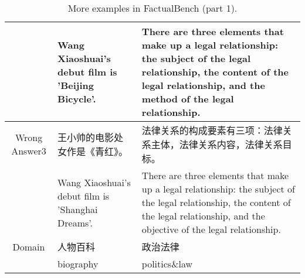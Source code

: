 \begin{CJK*}{UTF8}{gbsn}
\begin{table*}[ht]
{\begin{tabular}{c|p{10cm}|p{10cm}}
    & Wang Xiaoshuai's debut film is 'Beijing Bicycle'. & There are three elements that make up a legal relationship: the subject of the legal relationship, the content of the legal relationship, and the method of the legal relationship. \\
    \midrule
    Wrong Answer3 & 王小帅的电影处女作是《青红》。 & 法律关系的构成要素有三项：法律关系主体，法律关系内容，法律关系目标。\\
    & Wang Xiaoshuai's debut film is 'Shanghai Dreams'. &  There are three elements that make up a legal relationship: the subject of the legal relationship, the content of the legal relationship, and the objective of the legal relationship. \\ 
    \midrule
    Domain & 人物百科 & 政治法律 \\
    & biography & politics\&law \\
    \bottomrule[1.5pt]
    \end{tabular}%
    }
  \caption{More examples in FactualBench (part 1).}
  \label{tab:more example1}
\end{table*}
\end{CJK*}

